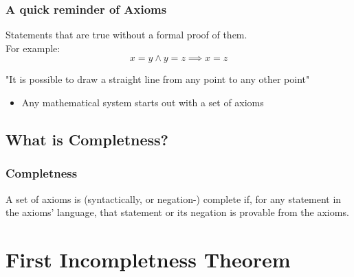 \documentclass[aspectratio=169]{beamer}
\begin{document}
\begin{frame}
	\frametitle{A quick reminder of Axioms}
	 \begin{Definition}[Axiom]
	 	Statements that are true without a formal proof of them. \\ For example:
	 	\[x = y \land y = z \implies x = z\]
	  	\begin{center}
	  		"It is possible to draw a straight line from any point to any other point"
	  	\end{center}
	 \end{Definition}
	 \begin{itemize}
	 	\item Any mathematical system starts out with a set of axioms
	 \end{itemize}
\end{frame}
\subsection{What is Completness?}
\begin{frame}
	\frametitle{Completness}
	 \begin{Definition}[Complete]
	 	A set of axioms is (syntactically, or negation-) complete if, for any statement in the axioms' language, that statement or its negation is provable from the axioms. \cite{smith}
	 \end{Definition}
\end{frame}
\section{First Incompletness Theorem}
\end{document}
